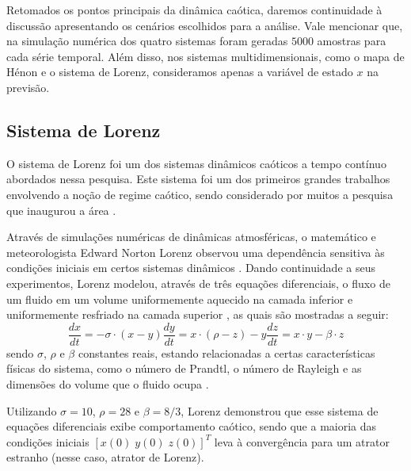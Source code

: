 \documentclass[a4paper, 12pt]{article}
\begin{document}
Retomados os pontos principais da dinâmica caótica, daremos continuidade à discussão apresentando os cenários escolhidos para a análise. Vale mencionar que, na simulação numérica dos quatro sistemas foram geradas $5000$ amostras para cada série temporal. Além disso, nos sistemas multidimensionais, como o mapa de Hénon e o sistema de Lorenz, consideramos apenas a variável de estado $x$ na previsão.

\subsection{Sistema de Lorenz}

O sistema de Lorenz foi um dos sistemas dinâmicos caóticos a tempo contínuo abordados nessa pesquisa. Este sistema foi um dos primeiros grandes trabalhos envolvendo a noção de regime caótico, sendo considerado por muitos a pesquisa que inaugurou a área \cite{gleick1998chaos}. 

Através de simulações numéricas de dinâmicas atmosféricas, o matemático e meteorologista Edward Norton Lorenz observou uma dependência sensitiva às condições iniciais em certos sistemas dinâmicos \cite{fiedler1994caos}. Dando continuidade a seus experimentos, Lorenz modelou, através de três equações diferenciais, o fluxo de um fluido em um volume uniformemente aquecido na camada inferior e uniformemente resfriado na camada superior \cite{lorenz1963deterministic}, as quais são mostradas a seguir: 
\begin{subequations}
\begin{equation}
\frac{dx}{dt} = -\sigma \cdot (x - y)
\end{equation}
\begin{equation}
\frac{dy}{dt} = x \cdot (\rho - z) - y
\end{equation}
\begin{equation}
\frac{dz}{dt} = x \cdot y - \beta \cdot z
\end{equation}
\end{subequations}
sendo $\sigma$, $\rho$ e $\beta$ constantes reais, estando relacionadas a certas características físicas do sistema, como o número de Prandtl, o número de Rayleigh e as dimensões do volume que o fluido ocupa \cite{fiedler1994caos}.

Utilizando $\sigma = 10$, $\rho = 28$ e $\beta = 8/3$, Lorenz demonstrou que esse sistema de equações diferenciais exibe comportamento caótico, sendo que a maioria das condições iniciais $[x(0)\; y(0)\; z(0)]^T$ leva à convergência para um atrator estranho (nesse caso, atrator de Lorenz).
\end{document}
